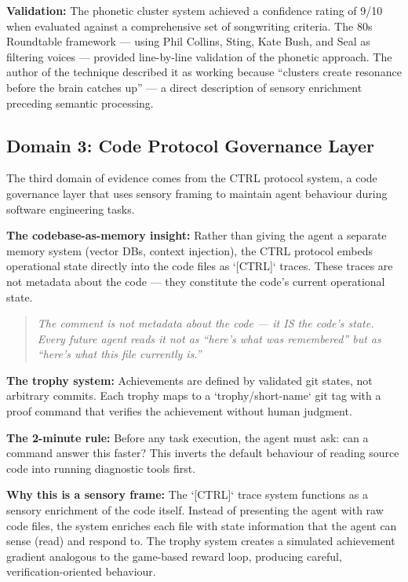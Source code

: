 \documentclass[11pt,a4paper]{article}
\begin{document}
\textbf{Validation:} The phonetic cluster system achieved a confidence rating of 9/10 when evaluated against a comprehensive set of songwriting criteria. The 80s Roundtable framework --- using Phil Collins, Sting, Kate Bush, and Seal as filtering voices --- provided line-by-line validation of the phonetic approach. The author of the technique described it as working because ``clusters create resonance before the brain catches up'' --- a direct description of sensory enrichment preceding semantic processing.

\subsection{Domain 3: Code Protocol Governance Layer}

The third domain of evidence comes from the CTRL protocol system, a code governance layer that uses sensory framing to maintain agent behaviour during software engineering tasks.

\textbf{The codebase-as-memory insight:} Rather than giving the agent a separate memory system (vector DBs, context injection), the CTRL protocol embeds operational state directly into the code files as `[CTRL]` traces. These traces are not metadata about the code --- they constitute the code's current operational state.

\begin{quote}
\textit{The comment is not metadata about the code --- it IS the code's state. Every future agent reads it not as ``here's what was remembered'' but as ``here's what this file currently is.''}
\end{quote}

\textbf{The trophy system:} Achievements are defined by validated git states, not arbitrary commits. Each trophy maps to a `trophy/short-name` git tag with a proof command that verifies the achievement without human judgment.

\textbf{The 2-minute rule:} Before any task execution, the agent must ask: can a command answer this faster? This inverts the default behaviour of reading source code into running diagnostic tools first.

\textbf{Why this is a sensory frame:} The `[CTRL]` trace system functions as a sensory enrichment of the code itself. Instead of presenting the agent with raw code files, the system enriches each file with state information that the agent can sense (read) and respond to. The trophy system creates a simulated achievement gradient analogous to the game-based reward loop, producing careful, verification-oriented behaviour.
\end{document}
